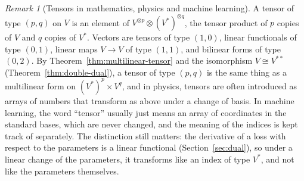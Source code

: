 \documentclass[11pt]{article}
\theoremstyle{definition}
\theoremstyle{plain}
\theoremstyle{remark}
\newtheorem{remark}[definition]{Remark}
\begin{document}
\begin{remark}[Tensors in mathematics, physics and machine learning]
    A tensor of type $(p, q)$ on $V$ is an element of $V^{\otimes p} \otimes (V^*)^{\otimes q}$, the tensor product of $p$ copies of $V$ and $q$ copies of $V^*$. Vectors are tensors of type $(1, 0)$, linear functionals of type $(0, 1)$, linear maps $V \to V$ of type $(1, 1)$, and bilinear forms of type $(0, 2)$. By Theorem~\ref{thm:multilinear-tensor} and the isomorphism $V \cong V^{**}$ (Theorem~\ref{thm:double-dual}), a tensor of type $(p, q)$ is the same thing as a multilinear form on $(V^*)^p \times V^q$, and in physics, tensors are often introduced as arrays of numbers that transform as above under a change of basis. In machine learning, the word ``tensor'' usually just means an array of coordinates in the standard bases, which are never changed, and the meaning of the indices is kept track of separately. The distinction still matters: the derivative of a loss with respect to the parameters is a linear functional (Section~\ref{sec:dual}), so under a linear change of the parameters, it transforms like an index of type $V^*$, and not like the parameters themselves.
\end{remark}
\end{document}
